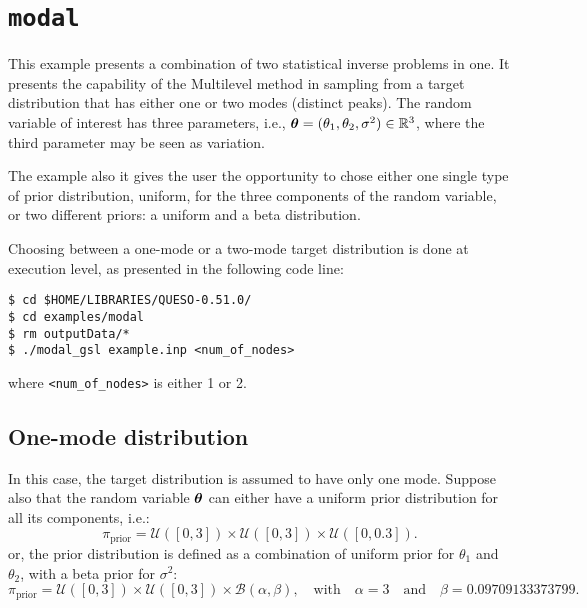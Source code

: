 \section{\texttt{modal}}\label{sec:example_modal}


This example presents a combination of two statistical inverse problems in one. 
It presents the capability of the Multilevel method in sampling from a target distribution that has either one or two modes (distinct peaks). The random variable of interest has three parameters, i.e., $\mbox{\boldmath$ \theta $}=(\theta_1,\theta_2, \sigma^2) \in \mathbb{R}^3$, where the third parameter may be seen as variation.

The example also it gives the user the opportunity to chose either one single type of prior distribution, uniform, for the three components of the random variable, or two different priors: a uniform and a beta distribution.

Choosing between a one-mode or a two-mode target distribution is done at execution level, as presented in the following code line:

\begin{lstlisting}[label={},caption={}]
$ cd $HOME/LIBRARIES/QUESO-0.51.0/
$ cd examples/modal
$ rm outputData/*
$ ./modal_gsl example.inp <num_of_nodes>
\end{lstlisting}
where \verb+<num_of_nodes>+ is either 1 or 2.
% 
% 
% 
% 
% 
% 
% 
% 
\subsection{One-mode distribution}

In this case, the target distribution is assumed to have only one mode.
Suppose also that the random variable $\mbox{\boldmath$ \theta $}$  can either have a uniform prior distribution for all its components, i.e.:
$$
\pi_{\text{prior}}=\mathcal{U}([0,3]) \times \mathcal{U}([0,3]) \times \mathcal{U}([0,0.3]).
$$
or, the prior distribution is defined as a combination of uniform prior for $\theta_1$ and $\theta_2$, with a beta prior for $\sigma^2$:
$$
\pi_{\text{prior}}=\mathcal{U}([0,3]) \times \mathcal{U}([0,3]) \times \mathcal{B}(\alpha,\beta), \quad \text{with} \quad \alpha=3 \quad\text{and}\quad \beta=0.09709133373799.
$$

